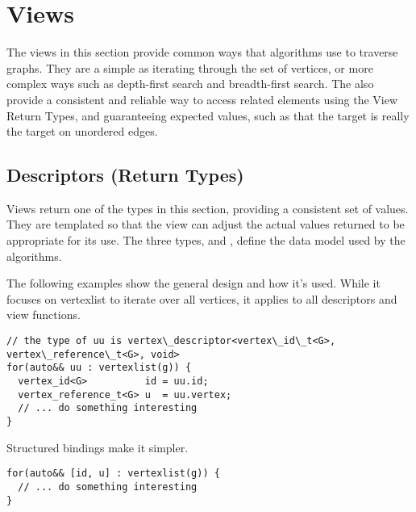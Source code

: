 \chapter{Views}

%
%

The views in this section provide common ways that algorithms use to traverse graphs. They are a simple as iterating through the set of vertices, or more complex ways such as depth-first search and breadth-first search. The also provide a consistent and reliable way to access related elements using the View Return Types, and guaranteeing expected values, such as that the target is really the target on unordered edges.

\section{Descriptors (Return Types)}
Views return one of the types in this section, providing a consistent set of values. They are templated so that the view can adjust the 
actual values returned to be appropriate for its use. The three types,  and 
, define the data model used by the algorithms.

The following examples show the general design and how it's used. While it focuses 
on vertexlist to iterate over all vertices, it applies to all descriptors and view functions.

\begin{lstlisting}
// the type of uu is vertex\_descriptor<vertex\_id\_t<G>, vertex\_reference\_t<G>, void>
for(auto&& uu : vertexlist(g)) {
  vertex_id<G>          id = uu.id;
  vertex_reference_t<G> u  = uu.vertex;
  // ... do something interesting
}
\end{lstlisting}

Structured bindings make it simpler.
\begin{lstlisting}
for(auto&& [id, u] : vertexlist(g)) {
  // ... do something interesting
}
\end{lstlisting}

